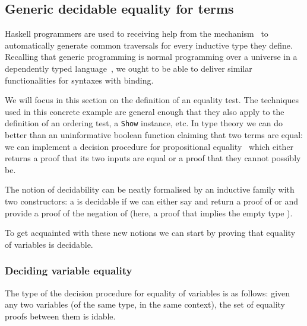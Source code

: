 \subsection{Generic decidable equality for terms}

Haskell programmers are used to receiving help from the 
mechanism~\cite{DBLP:journals/entcs/HinzeJ00,DBLP:conf/haskell/MagalhaesDJL10}
to automatically generate common traversals for every inductive type
they define. Recalling that generic programming is normal programming
over a universe in a dependently typed
language~\cite{DBLP:conf/ifip2-1/AltenkirchM02}, we ought to be able to
deliver similar functionalities for syntaxes with binding.

We will focus in this section on the definition of an equality test. The
techniques used in this concrete example are general enough that they also
apply to the definition of an ordering test, a \texttt{Show} instance, etc.
In type theory we can do better than an uninformative boolean function
claiming that two terms are equal: we can implement a decision procedure
for propositional equality~\cite{DBLP:conf/icfp/LohM11} which either
returns a proof that its two inputs are equal or a proof that they
cannot possibly be.

The notion of decidability can be neatly formalised by an inductive family
with two constructors: a   is decidable if we can either say
 and return a proof of  or  and provide a proof of
the negation of  (here, a proof that  implies the empty type
).

\noindent
\begin{minipage}{\textwidth}
  \begin{minipage}[t]{0.45\textwidth}
  \end{minipage}
  \begin{minipage}[t]{0.45\textwidth}
  \end{minipage}
\end{minipage}

To get acquainted with these new notions we can start by proving that equality
of variables is decidable.

\subsubsection{Deciding variable equality}

The type of the decision procedure for equality of variables is as follows:
given any two variables (of the same type, in the same context), the set of
equality proofs between them is idable.

